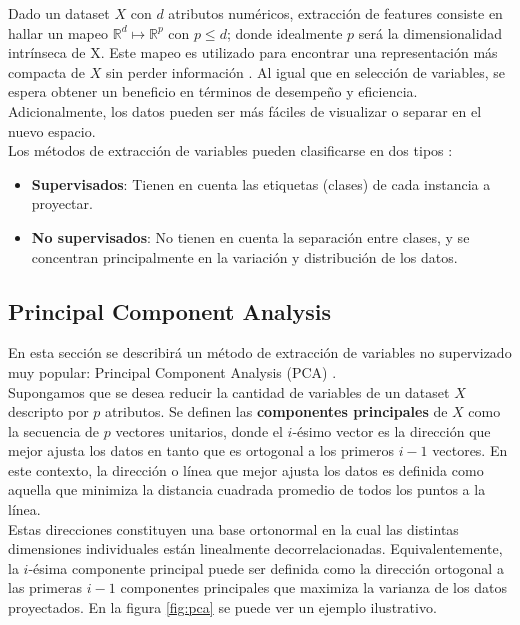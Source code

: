 Dado un dataset $X$ con $d$ atributos numéricos, extracción de features consiste en hallar un mapeo $\mathds{R}^d \mapsto \mathds{R}^p$ con $p \leq d$; donde idealmente $p$ será la dimensionalidad intrínseca de X. Este mapeo es utilizado para encontrar una representación más compacta de $X$ sin perder información \cite{fextraction}. Al igual que en selección de variables, se espera obtener un beneficio en términos de desempeño y eficiencia. Adicionalmente, los datos pueden ser más fáciles de visualizar o separar en el nuevo espacio. \\

Los métodos de extracción de variables pueden clasificarse en dos tipos \cite{fextraction}: 
\begin{itemize}
\item \textbf{Supervisados}: Tienen en cuenta las etiquetas (clases) de cada instancia a proyectar.
\item \textbf{No supervisados}: No tienen en cuenta la separación entre clases, y se concentran principalmente en la variación y distribución de los datos.
\end{itemize}

\subsection{Principal Component Analysis}

\label{PCA}

En esta sección se describirá un método de extracción de variables no supervizado muy popular: Principal Component Analysis (PCA) \cite{han2012mining}. \\

Supongamos que se desea reducir la cantidad de variables de un dataset $X$ descripto por $p$ atributos. Se definen las \textbf{componentes principales} de $X$ como la secuencia de $p$ vectores unitarios, donde el $i$-ésimo vector es la dirección que mejor ajusta los datos en tanto que es ortogonal a los primeros $i-1$ vectores. En este contexto, la dirección o línea que mejor ajusta los datos es definida como aquella que minimiza la distancia cuadrada promedio de todos los puntos a la línea. \\

Estas direcciones constituyen una base ortonormal en la cual las distintas dimensiones individuales están linealmente decorrelacionadas.  Equivalentemente, la $i$-ésima componente principal puede ser definida como la dirección ortogonal a las primeras $i-1$ componentes principales que maximiza la varianza de los datos proyectados. En la figura \ref{fig:pca} se puede ver un ejemplo ilustrativo.  \\

